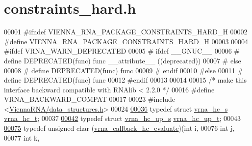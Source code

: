 \hypertarget{constraints__hard_8h_source}{}\section{constraints\+\_\+hard.\+h}
\label{constraints__hard_8h_source}

\begin{DoxyCode}
00001 \textcolor{preprocessor}{#ifndef VIENNA\_RNA\_PACKAGE\_CONSTRAINTS\_HARD\_H}
00002 \textcolor{preprocessor}{#define VIENNA\_RNA\_PACKAGE\_CONSTRAINTS\_HARD\_H}
00003 
00004 \textcolor{preprocessor}{#ifdef VRNA\_WARN\_DEPRECATED}
00005 \textcolor{preprocessor}{# ifdef \_\_GNUC\_\_}
00006 \textcolor{preprocessor}{#  define DEPRECATED(func) func \_\_attribute\_\_ ((deprecated))}
00007 \textcolor{preprocessor}{# else}
00008 \textcolor{preprocessor}{#  define DEPRECATED(func) func}
00009 \textcolor{preprocessor}{# endif}
00010 \textcolor{preprocessor}{#else}
00011 \textcolor{preprocessor}{# define DEPRECATED(func) func}
00012 \textcolor{preprocessor}{#endif}
00013 
00014 
00015 \textcolor{comment}{/* make this interface backward compatible with RNAlib < 2.2.0 */}
00016 \textcolor{preprocessor}{#define VRNA\_BACKWARD\_COMPAT}
00017 
00023 \textcolor{preprocessor}{#include <\hyperlink{data__structures_8h}{ViennaRNA/data\_structures.h}>}
00024 
\hyperlink{group__hard__constraints_gac7e4c4f8abe3163a68110c5bff24e01d}{00036} \textcolor{keyword}{typedef} \textcolor{keyword}{struct  }\hyperlink{group__hard__constraints_structvrna__hc__s}{vrna\_hc\_s} \hyperlink{group__hard__constraints_structvrna__hc__s}{vrna\_hc\_t};
00037 
\hyperlink{group__hard__constraints_ga8cd53427a942a81c87ec526bbff32ef9}{00042} \textcolor{keyword}{typedef} \textcolor{keyword}{struct }\hyperlink{group__hard__constraints_structvrna__hc__up__s}{vrna\_hc\_up\_s} \hyperlink{group__hard__constraints_structvrna__hc__up__s}{vrna\_hc\_up\_t};
00043 
\hyperlink{group__hard__constraints_gae465f1d4a3d8b6592b38ecbb0d9f613d}{00075} \textcolor{keyword}{typedef} \textcolor{keywordtype}{unsigned} char (\hyperlink{group__hard__constraints_gae465f1d4a3d8b6592b38ecbb0d9f613d}{vrna\_callback\_hc\_evaluate})(\textcolor{keywordtype}{int}           i,
00076                                                   \textcolor{keywordtype}{int}           j,
00077                                                   \textcolor{keywordtype}{int}           k,

\end{DoxyCode}
